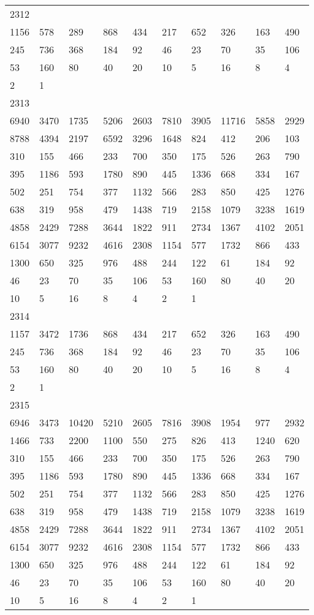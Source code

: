 \begin{longtable}{*{10}{l}}
2312&&&&&&&&&\\
1156& 578& 289& 868& 434& 217& 652& 326& 163& 490\\
245& 736& 368& 184& 92& 46& 23& 70& 35& 106\\
53& 160& 80& 40& 20& 10& 5& 16& 8& 4\\
2& 1& \\

2313&&&&&&&&&\\
6940& 3470& 1735& 5206& 2603& 7810& 3905& 11716& 5858& 2929\\
8788& 4394& 2197& 6592& 3296& 1648& 824& 412& 206& 103\\
310& 155& 466& 233& 700& 350& 175& 526& 263& 790\\
395& 1186& 593& 1780& 890& 445& 1336& 668& 334& 167\\
502& 251& 754& 377& 1132& 566& 283& 850& 425& 1276\\
638& 319& 958& 479& 1438& 719& 2158& 1079& 3238& 1619\\
4858& 2429& 7288& 3644& 1822& 911& 2734& 1367& 4102& 2051\\
6154& 3077& 9232& 4616& 2308& 1154& 577& 1732& 866& 433\\
1300& 650& 325& 976& 488& 244& 122& 61& 184& 92\\
46& 23& 70& 35& 106& 53& 160& 80& 40& 20\\
10& 5& 16& 8& 4& 2& 1& \\

2314&&&&&&&&&\\
1157& 3472& 1736& 868& 434& 217& 652& 326& 163& 490\\
245& 736& 368& 184& 92& 46& 23& 70& 35& 106\\
53& 160& 80& 40& 20& 10& 5& 16& 8& 4\\
2& 1& \\

2315&&&&&&&&&\\
6946& 3473& 10420& 5210& 2605& 7816& 3908& 1954& 977& 2932\\
1466& 733& 2200& 1100& 550& 275& 826& 413& 1240& 620\\
310& 155& 466& 233& 700& 350& 175& 526& 263& 790\\
395& 1186& 593& 1780& 890& 445& 1336& 668& 334& 167\\
502& 251& 754& 377& 1132& 566& 283& 850& 425& 1276\\
638& 319& 958& 479& 1438& 719& 2158& 1079& 3238& 1619\\
4858& 2429& 7288& 3644& 1822& 911& 2734& 1367& 4102& 2051\\
6154& 3077& 9232& 4616& 2308& 1154& 577& 1732& 866& 433\\
1300& 650& 325& 976& 488& 244& 122& 61& 184& 92\\
46& 23& 70& 35& 106& 53& 160& 80& 40& 20\\
10& 5& 16& 8& 4& 2& 1& \\


\end{longtable}
